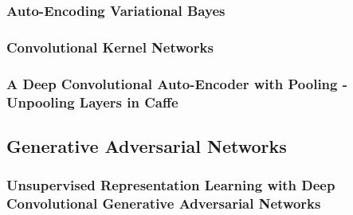 \documentclass[final, paper=letter,5p,times,twocolumn]{elsarticle}
\begin{document}
\subsubsection{Auto-Encoding Variational Bayes}

\subsubsection{Convolutional Kernel Networks}

\subsubsection{A Deep Convolutional Auto-Encoder with Pooling - Unpooling Layers in Caffe}

\subsection{Generative Adversarial Networks}

\subsubsection{Unsupervised Representation Learning with Deep Convolutional Generative Adversarial Networks}





\end{document}

